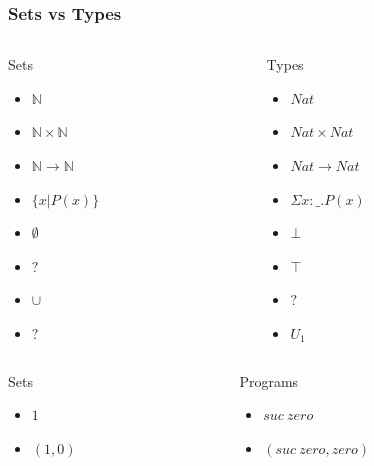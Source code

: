 \documentclass[9pt]{beamer}
\begin{document}
\begin{frame}
\frametitle{Sets vs Types}
\begin{columns}

\begin{column}{0.4 \textwidth}
\begin{exampleblock}{Sets}
  \begin{itemize}
    \item $\mathbb{N}$
    \item $\mathbb{N} \times \mathbb{N}$
    \item $\mathbb{N} \to \mathbb{N}$
    \item $\{x|P(x)\}$
    \item $\emptyset$
    \item $?$
    \item $\cup$
    \item $?$
  \end{itemize}
\end{exampleblock}
\end{column}

\begin{column}{0.4 \textwidth}
\begin{block}{Types}
  \begin{itemize}
    \item $Nat$
    \item $Nat \times Nat$
    \item $Nat \to Nat$
    \item $\Sigma x : \_ . P(x)$
    \item $\bot$
    \item $\top$
    \item $?$
    \item $U_1$
  \end{itemize}
\end{block}
\end{column}
\end{columns}

\begin{columns}

\begin{column}{0.4 \textwidth}
\begin{exampleblock}{Sets}
  \begin{itemize}
    \item $1$
    \item $(1,0)$
  \end{itemize}
\end{exampleblock}
\end{column}

\begin{column}{0.4 \textwidth}
\begin{block}{Programs}
  \begin{itemize}
    \item $suc\ zero$
    \item $(suc\ zero, zero)$
  \end{itemize}
\end{block}
\end{column}
\end{columns}

\end{frame}
\end{document}
